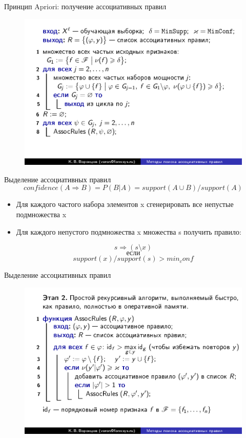 \documentclass{beamer}
\begin{document}
\begin{frame}{Принцип Apriori: получение ассоциативных правил}
\begin{figure}[h]
\centering
\includegraphics[scale=0.45]{images/lec08-pic12.png}
\end{figure}
\end{frame}

\begin{frame}{Выделение ассоциативных правил}
\[confidence(A\Rightarrow B)= P(B|A) = support(A\cup B)/support(A)\]

\begin{itemize}
\item Для каждого частого набора элементов x сгенерировать все непустые
подмножества x
\item Для каждого непустого подмножества x множества s получить правило:
\end{itemize}
\[s \Rightarrow (s\setminus x)\]
\[если\]
\[support(x)/support(s) > min_conf\]
\end{frame}

\begin{frame}{Выделение ассоциативных правил}
\begin{figure}[h]
\centering
\includegraphics[scale=0.45]{images/lec08-pic14.png}
\end{figure}
\end{frame}
\end{document}
